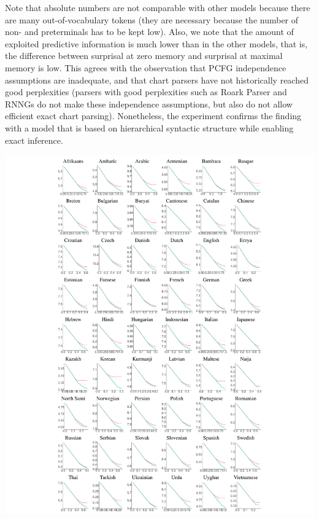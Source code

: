 \documentclass[11pt,letterpaper]{article}
\newcommand\mhahn[1]{{\color{red}(#1)}}
\begin{document}

Note that absolute numbers are not comparable with other models because there are many out-of-vocabulary tokens (they are necessary because the number of non- and preterminals has to be kept low).
Also, we note that the amount of exploited predictive information is much lower than in the other models, that is, the difference between surprisal at zero memory and surprisal at maximal memory is low.
This agrees with the observation that PCFG independence assumptions are inadequate, and that chart parsers have not historically reached good perplexities (parsers with good perplexities such as Roark Parser and RNNGs do not make these independence assumptions, but also do not allow efficient exact chart parsing).
Nonetheless, the experiment confirms the finding with a model that is based on hierarchical syntactic structure while enabling exact inference.

\begin{center}
\includegraphics[width=\textwidth]{results-table-pcfg.pdf}
\label{fig:resu-pcfg}
\end{center}
\end{document}
